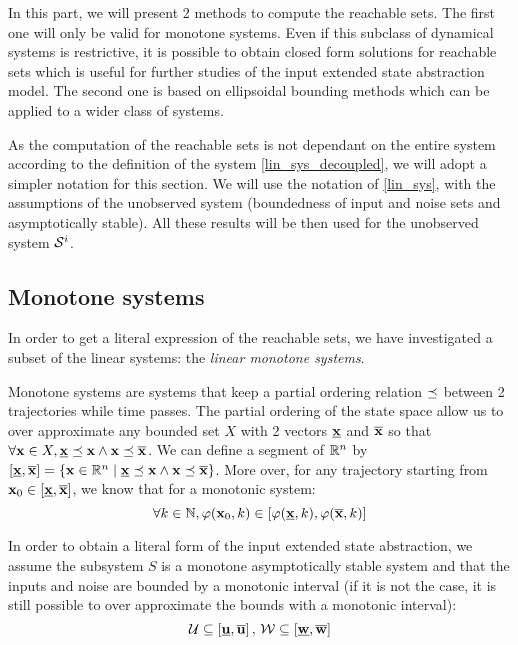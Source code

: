 In this part, we will present 2 methods to compute the reachable sets.
The first one will only be valid for monotone systems. Even if this subclass of dynamical systems is restrictive, it is possible to obtain closed form solutions for reachable sets which is useful for further studies of the input extended state abstraction model.
The second one is based on ellipsoidal bounding methods which can be applied to a wider class of systems.


As the computation of the reachable sets is not dependant on the entire system according to the definition of the system \ref{lin_sys_decoupled}, we will adopt a simpler notation for this section.
We will use the notation of \ref{lin_sys}, with the assumptions of the unobserved system (boundedness of input and noise sets and asymptotically stable).
All these results will be then used for the unobserved system $\mathcal{S}^i$.

\subsection{Monotone systems}
In order to get a literal expression of the reachable sets, we have investigated a subset of the linear systems: the \textit{linear monotone systems}.

Monotone systems are systems that keep a partial ordering relation $\preceq$ between 2 trajectories while time passes.
The partial ordering of the state space allow us to over approximate any bounded set $X$ with 2 vectors $\underline{ \mathbf{x}}$ and $\overline{ \mathbf{x}}$ so that $\forall  \mathbf{x} \in X, \underline{ \mathbf{x}} \preceq  \mathbf{x} \wedge  \mathbf{x} \preceq \overline{ \mathbf{x}}$. We can define a segment of $\mathbb{R}^n$ by $[\underline{ \mathbf{x}},\overline{ \mathbf{x}}] = \{ \mathbf{x} \in \mathbb{R}^n \mid  \underline{ \mathbf{x}} \preceq  \mathbf{x} \wedge  \mathbf{x} \preceq \overline{ \mathbf{x}}\}$.
More over, for any trajectory starting from $ \mathbf{x}_0 \in [\underline{ \mathbf{x}},\overline{ \mathbf{x}}]$, we know that for a monotonic system:
\begin{equation}
\forall k \in \mathbb{N}, \varphi( \mathbf{x}_0,k) \in [\varphi(\underline{ \mathbf{x}},k),\varphi(\overline{ \mathbf{x}},k)]
\end{equation}

In order to obtain a literal form of the input extended state abstraction, we assume the subsystem $S$ is a monotone asymptotically stable system and that the inputs and noise are bounded by a monotonic interval (if it is not the case, it is still possible to over approximate the bounds with a monotonic interval):
\begin{equation*}
\mathcal{U} \subseteq \left [ \underline{ \mathbf{u}}, \overline{ \mathbf{u}} \right ]
\textrm{, }
\mathcal{W} \subseteq \left [ \underline{ \mathbf{w}}, \overline{ \mathbf{w}} \right ]
\end{equation*}

